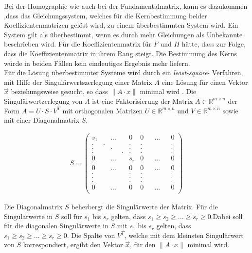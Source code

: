 Bei der Homographie wie auch bei der Fundamentalmatrix, kann es dazukommen ,dass das Gleichungssystem, welches für die Kernbestimmung beider Koeffizientenmatrizen gelöst wird, zu einem überbestimmten System wird. Ein System gilt als überbestimmt, wenn es durch mehr Gleichungen als Unbekannte beschrieben wird. Für die Koeffizientenmatrix für $F$ und $H$ hätte, dass zur Folge, dass die Koeffizientenmatrix in ihrem Rang steigt. Die Bestimmung des Kerns würde in beiden Fällen kein eindeutiges Ergebnis mehr liefern\cite{HZ}.  \\


Für die Lösung überbestimmter Systeme wird durch ein \textit{least-square}- Verfahren, mit Hilfe der Singulärwertszerlegung einer Matrix $A$ eine Lösung für einen Vektor $\vec{x}$ beziehungsweise gesucht, so dass $\parallel A \cdot x \parallel$ minimal wird \cite{HZ,Scholz,Schwarz}. Die Singulärwertzerlegung von $A$ ist eine Faktorisierung der Matrix \ensuremath{A \in \mathbb{R}^{m \times n}} der Form \ensuremath{A = U \cdot S \cdot V^T} mit orthogonalen Matrizen \ensuremath{U \in \mathbb{R}^{m \times n}} und \ensuremath{V \in \mathbb{R}^{m \times n}} sowie mit einer Diagonalmatrix $S$. 

 


\begin{gather}
	S = \begin{pmatrix}
		s_1&&...&&0&0&&...&&0\\
		.&.&&&.&.&&&&.\\
		.&&.&&.&.&&&&.\\
		.&&&.&.&.&&&&.\\
		0&&...&&s_r&0&&...&&0\\	
		0&&...&&0&0&&...&&0\\
		.&&&&.&.&&&&.\\
		.&&&&.&.&&&&.\\	
		.&&&&.&.&&&&.\\	
		0&&...&&0&0&&...&&0\\	
	\end{pmatrix}
\end{gather}

Die  Diagonalmatrix $S$ beherbergt die Singulärwerte der Matrix. Für die Singulärwerte in $S$ soll für $s_1$ bis $s_r$ gelten, dass \ensuremath{s_1 \geq s_2 \geq ... \geq s_r \ge 0 }\cite{Scholz}.Dabei soll für die diagonalen Singulärwerte in $S$ mit $s_1$ bis $s_r$ gelten, dass \ensuremath{s_1 \geq s_2 \geq ... \geq s_r \ge 0 }\cite{Scholz}. Die Spalte von $V^T$, welche mit dem kleinsten Singulärwert von $S$ korrespondiert, ergibt den Vektor $\vec{x}$, für den \ensuremath{\parallel A \cdot x\parallel} minimal wird. \\
 
  
  





